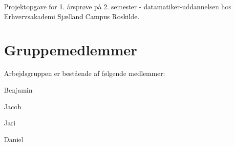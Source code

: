 Projektopgave for 1. årsprøve på 2. semester -\/ datamatiker-\/uddannelsen hos Erhvervsakademi Sjælland Campus Roskilde.

\section*{Gruppemedlemmer}

Arbejdsgruppen er bestående af følgende medlemmer\+:
\begin{DoxyItemize}
\item Benjamin
\item Jacob
\item Jari
\item Daniel 
\end{DoxyItemize}